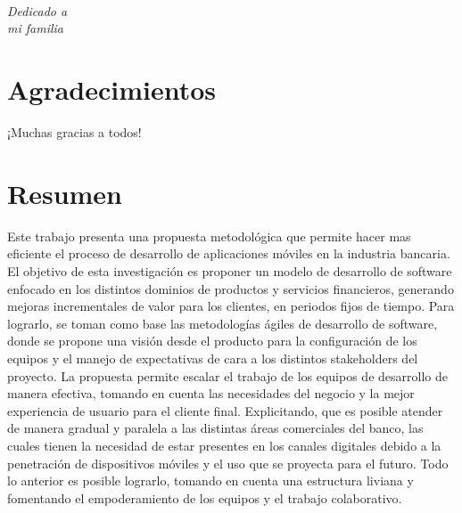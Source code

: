 \documentclass[a4paper,openright,12pt]{book}
\begin{document}
\newpage
$\ $
\thispagestyle{empty} %

\chapter*{}
\begin{flushright}
\textit{Dedicado a \\
mi familia}
\end{flushright}

\chapter*{Agradecimientos} %

¡Muchas gracias a todos!

\chapter*{Resumen} %

Este trabajo presenta una propuesta metodológica que permite hacer mas eficiente el proceso de desarrollo de aplicaciones móviles en la industria bancaria. El objetivo de esta investigación es proponer un modelo de desarrollo de software enfocado en los distintos dominios de productos y servicios financieros, generando mejoras incrementales de valor para los clientes, en periodos fijos de tiempo. Para lograrlo, se toman como base las metodologías ágiles de desarrollo de software, donde se propone una visión desde el producto para la configuración de los equipos y el manejo de expectativas de cara a los distintos stakeholders del proyecto. La propuesta permite escalar el trabajo de los equipos de desarrollo de manera efectiva, tomando en cuenta las necesidades del negocio y la mejor experiencia de usuario para el cliente final. Explicitando, que es posible atender de manera gradual y paralela a las distintas áreas comerciales del banco, las cuales tienen la necesidad de estar presentes en los canales digitales debido a la penetración de dispositivos móviles y el uso que se proyecta para el futuro. Todo lo anterior es posible lograrlo, tomando en cuenta una estructura liviana y fomentando el empoderamiento de los equipos y el trabajo colaborativo.
\end{document}

